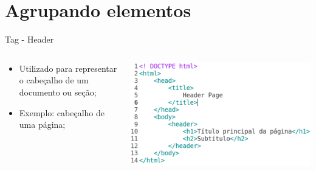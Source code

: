 \documentclass{beamer}
\begin{document}
\section{Agrupando elementos}
\begin{frame}{Tag - Header}
  \begin{columns}
    \begin{column}{0.4 \textwidth}
      \small
      \begin{itemize}
	\item Utilizado para representar o cabeçalho de um documento ou seção;
	 \item Exemplo: cabeçalho de uma página;
      \end{itemize}
    \end{column}
    \begin{column}{0.55\textwidth}
     \includegraphics[height=0.4\paperheight]{fig/aula2/html15.png}
    \end{column}
  \end{columns}
\end{frame}
\end{document}
